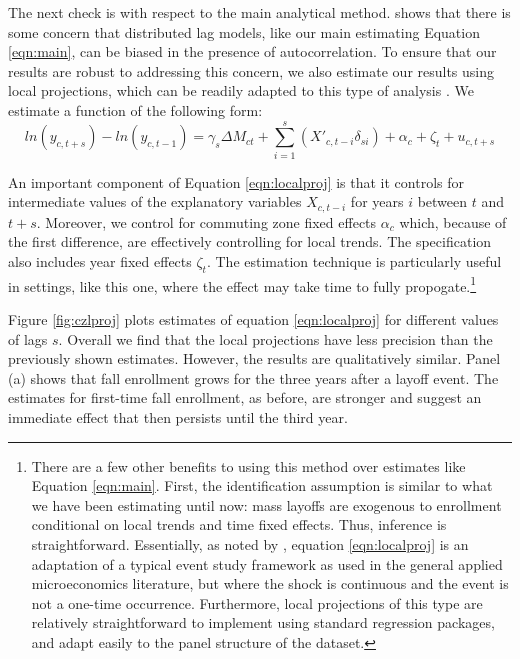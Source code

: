 The next check is with respect to the main analytical method.  \citet{Basso2016} shows that there is some concern that distributed lag models, like our main estimating Equation \ref{eqn:main}, can be biased in the presence of autocorrelation. To ensure that our results are robust  to addressing this concern, we also estimate our results using local projections, which can be readily adapted to this type of analysis \citep{Jorda2005, Basso2016}. We estimate a function of the following form: 
\begin{equation}
ln(y_{c,t+s})-ln(y_{c,t-1})=\gamma_s \Delta M_{ct}+\sum_{i=1}^s{(X'_{c,t-i}\delta_{si})}+\alpha_c+\zeta_t+u_{c,t+s}
\label{eqn:localproj}
\end{equation}

An important component of Equation \ref{eqn:localproj} is that it controls for intermediate values of the explanatory variables $X_{c,t-i}$ for years $i$ between $t$ and $t+s$. Moreover, we control for commuting zone fixed effects $\alpha_c$ which, because of the first difference, are effectively controlling for local trends. The specification also includes year fixed effects $\zeta_t$.  The estimation technique is particularly useful in settings, like this one, where the effect may take time to fully propogate.\footnote{There are a few other benefits to using this method over estimates like Equation \ref{eqn:main}. First, the identification assumption is similar to what we have been estimating until now: mass layoffs are exogenous to enrollment  conditional on local trends and time fixed effects. Thus, inference is straightforward. Essentially, as noted by \citet{Basso2016}, equation \ref{eqn:localproj} is an adaptation of a typical event study framework as used in the general applied microeconomics literature, but where the shock is continuous and the event is not a one-time occurrence. Furthermore, local projections of this type are relatively straightforward to implement using standard regression packages, and adapt easily to the panel structure of the dataset. } 

Figure \ref{fig:czlproj} plots estimates of equation \ref{eqn:localproj} for different values of lags $s$. Overall we find that the local projections have less precision than the previously shown estimates. However,  the results are qualitatively similar. Panel (a) shows that fall enrollment grows for the three years after a layoff event. The estimates for first-time fall enrollment, as before, are stronger and suggest an immediate effect that then persists until the third year. 


